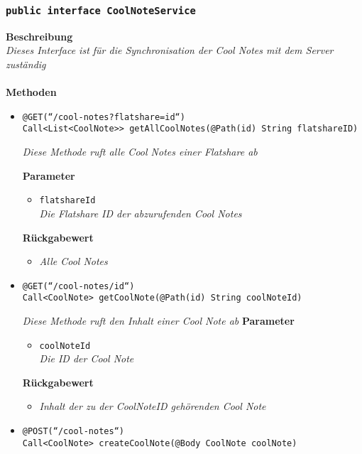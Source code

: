 	\subsubsection{\texttt{public interface CoolNoteService }}
	\textbf{Beschreibung}\\
	\textit{Dieses Interface ist für die Synchronisation der Cool Notes mit dem Server zuständig}\\
\\
	\textbf{Methoden} 
		\begin{itemize}
		\item\texttt{{@GET(``/cool-notes?flatshare={id}``)\\ Call<List<CoolNote>> getAllCoolNotes(@Path(\grqq id\grqq) String flatshareID)}}

		\textit{Diese Methode ruft alle Cool Notes einer Flatshare ab}

	\textbf{Parameter} 
			\begin{itemize}
				\item\texttt{flatshareId}\\
		 		\textit{Die Flatshare ID der abzurufenden Cool Notes}
	 		\end{itemize}
	 		
		\textbf{Rückgabewert} 
	\begin{itemize}
			\item\textit{Alle Cool Notes}
	 	\end{itemize}
	

      \item\texttt{{@GET(``/cool-notes/{id}``)\\ Call<CoolNote> getCoolNote(@Path(\grqq id\grqq) String coolNoteId)}}

		\textit{Diese Methode ruft den Inhalt einer Cool Note ab }
	\textbf{Parameter} 
			\begin{itemize}
				\item\texttt{coolNoteId}\\
		 		\textit{Die ID der Cool Note}
	 		\end{itemize}

		\textbf{Rückgabewert} 
		\begin{itemize}
			\item\textit{Inhalt der zu der CoolNoteID gehörenden Cool Note}
	 	\end{itemize}	

      \item\texttt{{@POST(``/cool-notes``)\\ Call<CoolNote> createCoolNote(@Body CoolNote coolNote)}}


\end{itemize}
